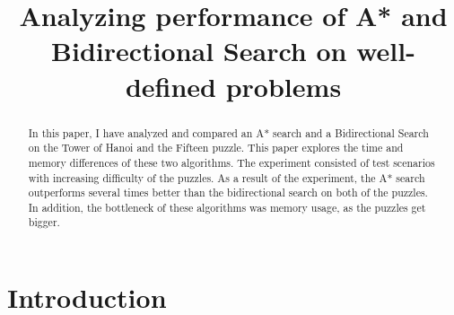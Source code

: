 \documentclass[conference]{IEEEtran}
\begin{document}
%
\title{Analyzing performance of A* and Bidirectional Search on well-defined problems}

\author{
}

\maketitle

\begin{abstract}
In this paper, I have analyzed and compared an A* search and a Bidirectional Search on the Tower of Hanoi and the Fifteen puzzle. This paper explores the time and memory differences of these two algorithms. The experiment consisted of test scenarios with increasing difficulty of the puzzles. As a result of the experiment, the A* search outperforms several times better than the bidirectional search on both of the puzzles. In addition, the bottleneck of these algorithms was memory usage, as the puzzles get bigger.
\end{abstract}



%
\IEEEpeerreviewmaketitle

\section{Introduction}
\end{document}
